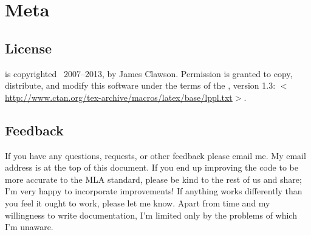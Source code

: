 \documentclass{ltxdockit}[2011/03/25]
\newcommand*{\biblatexmla}{\sty{biblatex-mla}\xspace}
\newcommand*{\mylink}[1]{$<$\url{#1}$>$}
\newcommand*{\mla}{MLA\xspace}
\newenvironment*{optionslistNOT}
  {\list{}{%
     \setlength{\labelwidth}{\marglistwidth}%
     \setlength{\labelsep}{\marglistsep}%
     \setlength{\leftmargin}{0pt}%
     \renewcommand*{\makelabel}[1]{\hss\marglistfont##1}}%
   \def\optionitem##1{%
     \item[{##1}]}}
  {\endlist}
\begin{document}
% 
% 	
% 	
% 
% 
% 	
% 	
% 	
% 	
% 	
% 	
% 	
% 	
% 	
% 	
% 	

\section{Meta}
\subsection{License}

\biblatexmla is copyrighted \textcopyright\ 2007--2013, by James Clawson. Permission is granted to copy, distribute, and modify this software under the terms of the \lppl, version 1.3: \mylink{http://www.ctan.org/tex-archive/macros/latex/base/lppl.txt}.

\subsection[Feedback]{Feedback}
\label{int:feb}

If you have any questions, requests, or other feedback please email me. My email address is at the top of this document. If you end up improving the code to be more accurate to the \mla{} standard, please be kind to the rest of us and share; I'm very happy to incorporate improvements! If anything works differently than you feel it ought to work, please let me know. Apart from time and my willingness to write documentation, I'm limited only by the problems of which I'm unaware.
\end{document}

